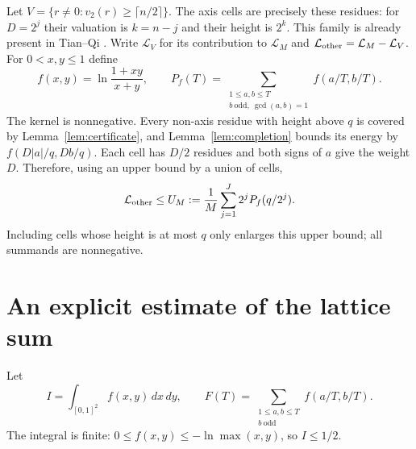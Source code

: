 \documentclass[11pt,a4paper]{article}
\numberwithin{equation}{section}
\theoremstyle{remark}
\newcommand{\odd}{\mathrm{odd}}
\begin{document}
Let $V=\{r\ne0:v_2(r)\ge\lceil n/2\rceil\}$.
The axis cells are precisely these residues: for $D=2^j$ their valuation
is $k=n-j$ and their height is $2^k$.
This family is already present in Tian--Qi \cite[Lemma~4]{TQ}.
Write $\mathcal L_V$ for its contribution to $\mathcal L_M$ and
$\mathcal L_{\rm other}=\mathcal L_M-\mathcal L_V$.
For $0<x,y\le1$ define
\[
 f(x,y)=\ln\frac{1+xy}{x+y},\qquad
 P_f(T)=\sum_{\substack{1\le a,b\le T\\b\ \odd,\ \gcd(a,b)=1}}
                                           f(a/T,b/T).
\]
The kernel is nonnegative. Every non-axis residue with height above $q$
is covered by Lemma~\ref{lem:certificate}, and Lemma~\ref{lem:completion}
bounds its energy by $f(D|a|/q,Db/q)$.
Each cell has $D/2$ residues and both signs of $a$ give the weight $D$.
Therefore, using an upper bound by a union of cells,
\begin{equation}\label{eq:U}
 \mathcal L_{\rm other}\le U_M:=\frac1M
                         \sum_{j=1}^J2^jP_f(q/2^j).
\end{equation}
Including cells whose height is at most $q$ only enlarges this upper
bound; all summands are nonnegative.

\section{An explicit estimate of the lattice sum}
Let
\[
 I=\int_{[0,1]^2}f(x,y)\,dx\,dy,\qquad
 F(T)=\sum_{\substack{1\le a,b\le T\\b\ \odd}}f(a/T,b/T).
\]
The integral is finite: $0\le f(x,y)\le-\ln\max(x,y)$, so $I\le1/2$.
\end{document}
